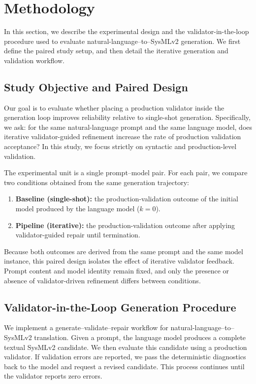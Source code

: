 \section{Methodology}


In this section, we describe the experimental design and the validator-in-the-loop procedure used to evaluate natural-language--to--SysMLv2 generation. We first define the paired study setup, and then detail the iterative generation and validation workflow.

\subsection{Study Objective and Paired Design}

Our goal is to evaluate whether placing a production validator inside the generation loop improves reliability relative to single-shot generation. Specifically, we ask: for the same natural-language prompt and the same language model, does iterative validator-guided refinement increase the rate of production validation acceptance? In this study, we focus strictly on syntactic and production-level validation.

The experimental unit is a single prompt--model pair. For each pair, we compare two conditions obtained from the same generation trajectory:
\begin{enumerate}
    \item \textbf{Baseline (single-shot):} the production-validation outcome of the initial model produced by the language model ($k=0$).
    \item \textbf{Pipeline (iterative):} the production-validation outcome after applying validator-guided repair until termination.
\end{enumerate}

Because both outcomes are derived from the same prompt and the same model instance, this paired design isolates the effect of iterative validator feedback. Prompt content and model identity remain fixed, and only the presence or absence of validator-driven refinement differs between conditions.

\subsection{Validator-in-the-Loop Generation Procedure}

We implement a generate--validate--repair workflow for natural-language--to--SysMLv2 translation. Given a prompt, the language model produces a complete textual SysMLv2 candidate. We then evaluate this candidate using a production validator. If validation errors are reported, we pass the deterministic diagnostics back to the model and request a revised candidate. This process continues until the validator reports zero errors.

